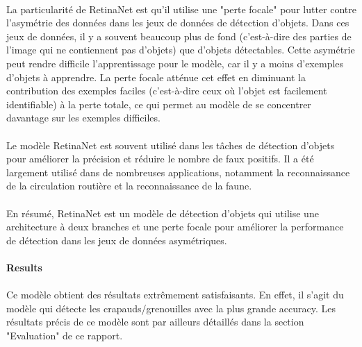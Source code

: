 \paragraph{} La particularité de RetinaNet est qu'il utilise une "perte focale" pour lutter contre l'asymétrie des données dans les jeux de données de détection d'objets. Dans ces jeux de données, il y a souvent beaucoup plus de fond (c'est-à-dire des parties de l'image qui ne contiennent pas d'objets) que d'objets détectables. Cette asymétrie peut rendre difficile l'apprentissage pour le modèle, car il y a moins d'exemples d'objets à apprendre. La perte focale atténue cet effet en diminuant la contribution des exemples faciles (c'est-à-dire ceux où l'objet est facilement identifiable) à la perte totale, ce qui permet au modèle de se concentrer davantage sur les exemples difficiles.

\paragraph{} Le modèle RetinaNet est souvent utilisé dans les tâches de détection d'objets pour améliorer la précision et réduire le nombre de faux positifs. Il a été largement utilisé dans de nombreuses applications, notamment la reconnaissance de la circulation routière et la reconnaissance de la faune.

\paragraph{} En résumé, RetinaNet est un modèle de détection d'objets qui utilise une architecture à deux branches et une perte focale pour améliorer la performance de détection dans les jeux de données asymétriques.

\paragraph{Results}

\paragraph{} Ce modèle obtient des résultats extrêmement satisfaisants. En effet, il s'agit du modèle qui détecte les crapauds/grenouilles avec la plus grande accuracy. Les résultats précis de ce modèle sont par ailleurs détaillés dans la section "Evaluation" de ce rapport.








